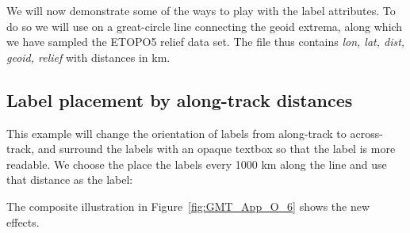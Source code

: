 We will now demonstrate some of the ways to play with the label attributes.  To do so we
will use  on a great-circle line connecting the geoid extrema, along which
we have sampled the ETOPO5 relief data set.  The file  thus contains
{\it lon, lat, dist, geoid, relief} with distances in km.

\subsection{Label placement by along-track distances}

This example will change the orientation of labels from along-track to across-track, and
surround the labels with an opaque textbox so that the label is more readable.  We choose
the place the labels every 1000 km along the line and use that distance as the label:



The composite illustration in Figure~\ref{fig:GMT_App_O_6} shows the new effects.

